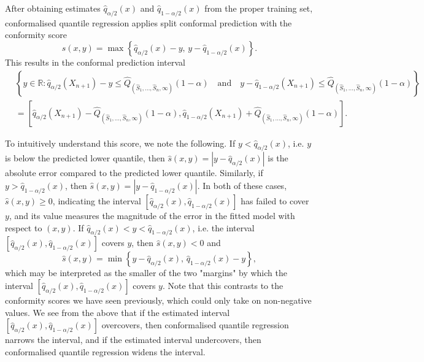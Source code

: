 \documentclass[11pt, titlepage]{article} %
\newcommand{\R}{\mathrm}
\numberwithin{equation}{section}
\theoremstyle{definition}
\numberwithin{theorem}{section}
\numberwithin{lemma}{section}
\numberwithin{corollary}{section}
\numberwithin{proposition}{section}
\numberwithin{definition}{section}
\numberwithin{remark}{section}
\begin{document}
\noindent
After obtaining estimates \(\hat{q}_{\alpha/2}(x)\) and \(\hat{q}_{1-\alpha/2}(x)\) from the proper training set, conformalised quantile regression applies split conformal prediction with the conformity score \begin{equation}
    \hat{s}(x,y) = \max\left\{ \hat{q}_{\alpha/2}(x) - y, \, y - \hat{q}_{1-\alpha/2}(x) \right\}.
\label{eqn:CQR_conformity_score}
\end{equation} This results in the conformal prediction interval \begin{align}
    &\left\{ y \in \mathbb{R}: \hat{q}_{\alpha/2}(X_{n+1}) - y \leq \hat{Q}_{(\hat{S}_1, \ldots, \hat{S}_n, \infty)}(1-\alpha) \quad \R{and} \quad y - \hat{q}_{1-\alpha/2}(X_{n+1}) \leq \hat{Q}_{(\hat{S}_1, \ldots, \hat{S}_n, \infty)}(1-\alpha) \right\} \nonumber \\
    &= \left[\hat{q}_{\alpha/2}(X_{n+1}) - \hat{Q}_{(\hat{S}_1, \ldots, \hat{S}_n, \infty)}(1-\alpha), \hat{q}_{1-\alpha/2}(X_{n+1}) + \hat{Q}_{(\hat{S}_1, \ldots, \hat{S}_n, \infty)}(1-\alpha)  \right].
\end{align}

\noindent
To intuitively understand this score, we note the following. If \(y < \hat{q}_{\alpha/2}(x)\), i.e. \(y\) is below the predicted lower quantile, then \(\hat{s}(x,y) = |y - \hat{q}_{\alpha/2}(x)|\) is the absolute error compared to the predicted lower quantile. Similarly, if \(y > \hat{q}_{1-\alpha/2}(x)\), then \(\hat{s}(x,y) = |y - \hat{q}_{1-\alpha/2}(x)|.\) In both of these cases, \(\hat{s}(x,y) \geq 0\), indicating the interval \([\hat{q}_{\alpha/2}(x), \hat{q}_{1-\alpha/2}(x)]\) has failed to cover \(y\), and its value measures the magnitude of the error in the fitted model with respect to \((x,y)\). If \(\hat{q}_{\alpha/2}(x) < y < \hat{q}_{1-\alpha/2}(x)\), i.e. the interval \([\hat{q}_{\alpha/2}(x), \hat{q}_{1-\alpha/2}(x)]\) covers \(y\), then \(\hat{s}(x,y) < 0\) and \[\hat{s}(x,y) = \min \left\{ y - \hat{q}_{\alpha/2}(x), \, \hat{q}_{1-\alpha/2}(x) - y \right\},\] which may be interpreted as the smaller of the two "margins" by which the interval \([\hat{q}_{\alpha/2}(x), \hat{q}_{1-\alpha/2}(x)]\) covers \(y\). Note that this contrasts to the conformity scores we have seen previously, which could only take on non-negative values. We see from the above that if the estimated interval \([\hat{q}_{\alpha/2}(x), \hat{q}_{1-\alpha/2}(x)]\) overcovers, then conformalised quantile regression narrows the interval, and if the estimated interval undercovers, then conformalised quantile regression widens the interval.
\end{document}
